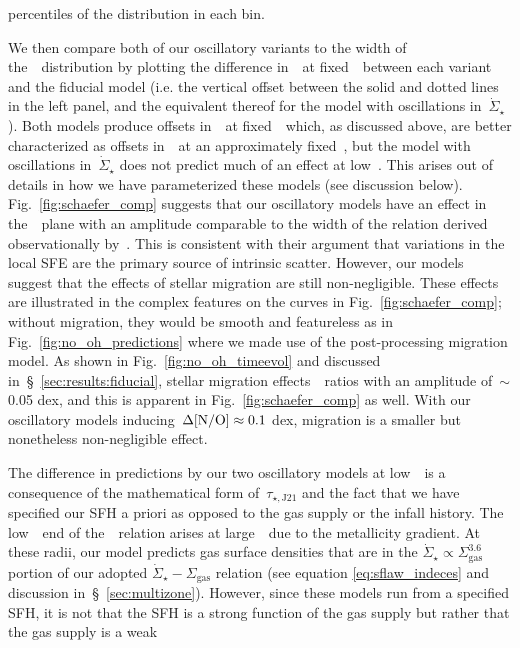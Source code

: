 \documentclass[ms.tex]{subfiles}
\begin{document}
percentiles of the distribution in each bin.
\par
We then compare both of our oscillatory variants to the width of
the~\no~distribution by plotting the difference in~\no~at fixed~\oh~between
each variant and the fiducial model (i.e. the vertical offset between the solid
and dotted lines in the left panel, and the equivalent thereof for the model
with oscillations in~$\dot{\Sigma}_\star$).
Both models produce offsets in~\no~at fixed~\oh~which, as discussed above, are
better characterized as offsets in~\oh~at an approximately fixed~\no, but the
model with oscillations in~$\dot{\Sigma}_\star$ does not predict much of an
effect at low~\oh.
This arises out of details in how we have parameterized these models (see
discussion below).
Fig.~\ref{fig:schaefer_comp} suggests that our oscillatory models have an
effect in the~\ohno~plane with an amplitude comparable to the width of the
relation derived observationally by~\citet{Schaefer2020}.
This is consistent with their argument that variations in the local SFE are
the primary source of intrinsic scatter.
However, our models suggest that the effects of stellar migration are still
non-negligible.
These effects are illustrated in the complex features on the curves in
Fig.~\ref{fig:schaefer_comp}; without migration, they would be smooth and
featureless as in Fig.~\ref{fig:no_oh_predictions} where we made use of the
post-processing migration model.
As shown in Fig.~\ref{fig:no_oh_timeevol} and discussed
in~\S~\ref{sec:results:fiducial}, stellar migration effects~\no~ratios with
an amplitude of~$\sim$0.05 dex, and this is apparent in
Fig.~\ref{fig:schaefer_comp} as well.
With our oscillatory models inducing~$\Delta\text{[N/O]} \approx 0.1$ dex, migration is
a smaller but nonetheless non-negligible effect.
\par
The difference in predictions by our two oscillatory models at low~\oh~is a
consequence of the mathematical form of~$\tau_{\star,\text{J21}}$ and the fact
that we have specified our SFH a priori as opposed to the gas supply or the
infall history.
The low~\oh~end of the~\ohno~relation arises at large~\rgal~due to the
metallicity gradient.
At these radii, our model predicts gas surface densities that are in the
$\dot{\Sigma}_\star \propto \Sigma_\text{gas}^{3.6}$ portion of our adopted
$\dot{\Sigma}_\star - \Sigma_\text{gas}$ relation (see equation
\ref{eq:sflaw_indeces} and discussion in~\S~\ref{sec:multizone}).
However, since these models run from a specified SFH, it is not that the SFH is
a strong function of the gas supply but rather that the gas supply is a weak
\end{document}
